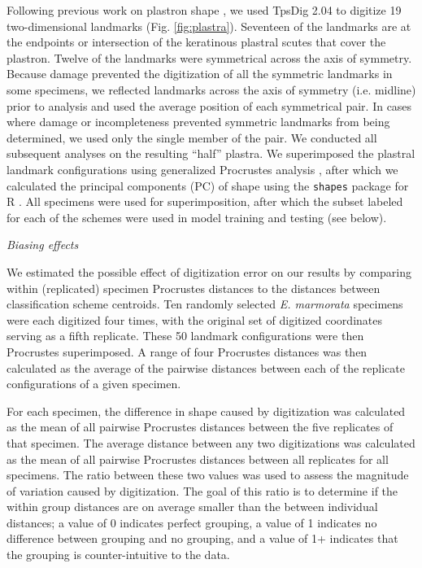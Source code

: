 \documentclass[12pt,letterpaper]{article}
\renewcommand{\subsection}[1]{%
\bigskip
\begin{center}
\begin{large}
\normalfont\itshape #1
\end{large}
\end{center}}
\begin{document}
Following previous work on plastron shape \citep{Angielczyk2007,Angielczyk2011,Angielczyk2013a}, we used TpsDig 2.04 \citep{Rohlf2005} to digitize 19 two-dimensional landmarks (Fig. \ref{fig:plastra}). Seventeen of the landmarks are at the endpoints or intersection of the keratinous plastral scutes that cover the plastron. Twelve of the landmarks were symmetrical across the axis of symmetry. Because damage prevented the digitization of all the symmetric landmarks in some specimens, we reflected landmarks across the axis of symmetry (i.e. midline) prior to analysis and used the average position of each symmetrical pair. In cases where damage or incompleteness prevented symmetric landmarks from being determined, we used only the single member of the pair. We conducted all subsequent analyses on the resulting ``half'' plastra. We superimposed the plastral landmark configurations using generalized Procrustes analysis \citep{Dryden1998a}, after which we calculated the principal components (PC) of shape using the \texttt{shapes} package for R \citep{R2016,Dryden2013}. All specimens were used for superimposition, after which the subset labeled for each of the schemes were used in model training and testing (see below).


\subsection{Biasing effects}
We estimated the possible effect of digitization error \citep{Arnqvist1998,Cramon2007,Munoz-MunozF.2010} on our results by comparing within (replicated) specimen Procrustes distances to the distances between classification scheme centroids. Ten randomly selected \textit{E. marmorata} specimens were each digitized four times, with the original set of digitized coordinates serving as a fifth replicate. These 50 landmark configurations were then Procrustes superimposed. A range of four Procrustes distances was then calculated as the average of the pairwise distances between each of the replicate configurations of a given specimen.

For each specimen, the difference in shape caused by digitization was calculated as the mean of all pairwise Procrustes distances between the five replicates of that specimen. The average distance between any two digitizations was calculated as the mean of all pairwise Procrustes distances between all replicates for all specimens. The ratio between these two values was used to assess the magnitude of variation caused by digitization. The goal of this ratio is to determine if the within group distances are on average smaller than the between individual distances; a value of 0 indicates perfect grouping, a value of 1 indicates no difference between grouping and no grouping, and a value of 1+ indicates that the grouping is counter-intuitive to the data.
\end{document}
